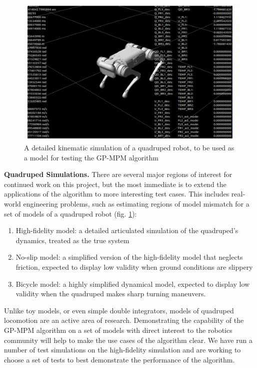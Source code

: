 \documentclass[12pt, conference]{IEEEtran}
\begin{document}
\begin{figure}[htbp]
    \centerline{\includegraphics[width=0.8\columnwidth]{img/quad.png}}
    \caption{A detailed kinematic simulation of a quadruped robot, to be used as a model for testing the GP-MPM algorithm}
    \label{fig:quad}
\end{figure}

\noindent\textbf{Quadruped Simulations.} There are several major regions of interest for continued work on this project, but the most immediate is to extend the applications of the algorithm to more interesting test cases. This includes real-world engineering problems, such as estimating regions of model mismatch for a set of models of a quadruped robot (fig. \ref{fig:quad}):

\begin{enumerate}
    \item High-fidelity model: a detailed articulated simulation of the quadruped's dynamics, treated as the true system
    \item No-slip model: a simplified version of the high-fidelity model that neglects friction, expected to display low validity when ground conditions are slippery
    \item Bicycle model: a highly simplified dynamical model, expected to display low validity when the quadruped makes sharp turning maneuvers.
\end{enumerate}

Unlike toy models, or even simple double integrators, models of quadruped locomotion are an active area of research. Demonstrating the capability of the GP-MPM algorithm on a set of models with direct interest to the robotics community will help to make the use cases of the algorithm clear. We have run a number of test simulations on the high-fidelity simulation and are working to choose a set of tests to best demonstrate the performance of the algorithm.
\end{document}
